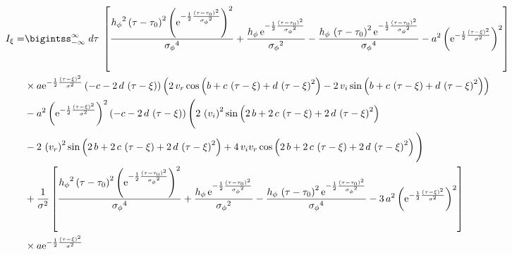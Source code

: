 \begin{landscape}
\begin{align}
I_{\xi}  = & \bigintss_{-\infty}^{\infty}  \; d\tau\; \left[ \frac{{{ h_{\phi}}}^{2} \left( \tau-{ \tau_0} \right) ^{2} \left( {
{\rm e}^{-\frac{1}{2}{\frac { \left( \tau-{ \tau_0} \right) ^{2}}{{{ 
\sigma_{\phi}}}^{2}}}}} \right) ^{2}}{{{ \sigma_{\phi}}}^{4}}+\frac{{ h_{\phi}}
\,{{\rm e}^{-\frac{1}{2}{\frac { \left( \tau-{ \tau_0} \right) ^{2}}{{{ 
\sigma_{\phi}}}^{2}}}}}}{{{ \sigma_{\phi}}}^{2}}-\frac{{ h_{\phi}}\, \left( \tau-{
 \tau_0} \right) ^{2}{{\rm e}^{-\frac{1}{2}{\frac { \left( \tau-{ \tau_0}
 \right) ^{2}}{{{ \sigma_{\phi}}}^{2}}}}}}{{{ \sigma_{\phi}}}^{4}}-{a}^{
2} \left( {{\rm e}^{-\frac{1}{2}{\frac { \left( \tau-\xi \right) ^{2}}{{
\sigma}^{2}}}}} \right) ^{2} \right] \nonumber \\
& \times a{{\rm e}^{-\frac{1}{2}{\frac { \left( 
\tau-\xi \right) ^{2}}{{\sigma}^{2}}}}} \left( -c-2\,d\, \left( \tau-{
 \xi} \right)  \right)  \left( 2\,v_r \cos \left( b+c\, \left( \tau-\xi \right) +d\, \left( \tau-{
 \xi} \right) ^{2} \right) -2\,v_i 
\sin \left( b+c\, \left( \tau-\xi \right) +d\, \left( \tau-\xi
 \right) ^{2} \right)  \right) \nonumber \\
 &-{a}^{2} \left( {{\rm e}^{-\frac{1}{2}{\frac 
{ \left( \tau-\xi \right) ^{2}}{{\sigma}^{2}}}}} \right) ^{2}
 \left( -c-2\,d\, \left( \tau-\xi \right)  \right)  \Bigg( 2\,
 \left( v_i  \right) ^{2}\sin \left( 2
\,b+2\,c\, \left( \tau-\xi \right) +2\,d\, \left( \tau-\xi
 \right) ^{2} \right) \nonumber \\
 &-2\, \left( v_r
 \right) ^{2}\sin \left( 2\,b+2\,c\, \left( \tau-\xi \right) +2\,d\,
 \left( \tau-\xi \right) ^{2} \right) +4\, v_i v_r \cos \left( 2\,b+2\,c\,
 \left( \tau-\xi \right) +2\,d\, \left( \tau-\xi \right) ^{2}
 \right)  \Bigg) \nonumber \\
 &+ \frac{1}{{\sigma}^{2}}\left[\frac{ {{ h_{\phi}}}^{2} \left( \tau-{ \tau_0}
 \right) ^{2} \left( {{\rm e}^{-\frac{1}{2}{\frac { \left( \tau-{ \tau_0}
 \right) ^{2}}{{{ \sigma_{\phi}}}^{2}}}}} \right) ^{2}}{{{ \sigma_{\phi}
}}^{4}}+\frac{{ h_{\phi}}\,{{\rm e}^{-\frac{1}{2}{\frac { \left( \tau-{ \tau_0}
 \right) ^{2}}{{{ \sigma_{\phi}}}^{2}}}}}}{{{ \sigma_{\phi}}}^{2}}-\frac{{ 
h_{\phi}}\, \left( \tau-{ \tau_0} \right) ^{2}{{\rm e}^{-\frac{1}{2}{\frac {
 \left( \tau-{ \tau_0} \right) ^{2}}{{{ \sigma_{\phi}}}^{2}}}}}}{{{ 
\sigma_{\phi}}}^{4}}-3\,{a}^{2} \left( {{\rm e}^{-\frac{1}{2}{\frac { \left( \tau-
{ \xi} \right) ^{2}}{{\sigma}^{2}}}}} \right) ^{2} \right] \nonumber \\
&\times  a{{\rm e}
^{-\frac{1}{2}{\frac { \left( \tau-\xi \right) ^{2}}{{\sigma}^{2}}}}}

\end{align}
\end{landscape}
